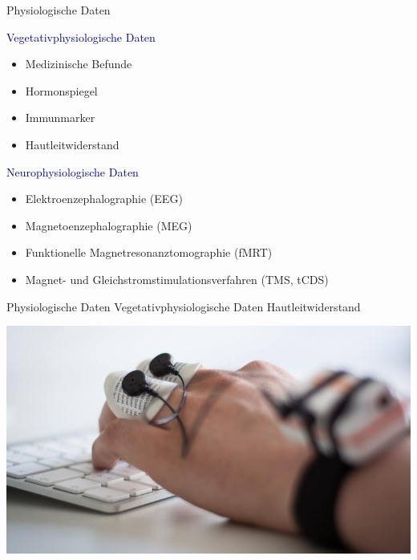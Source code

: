 \documentclass[
  8pt,
  ignorenonframetext,
]{beamer}
\providecommand{\tightlist}{%
  \setlength{\itemsep}{0pt}\setlength{\parskip}{0pt}}
\begin{document}
\begin{frame}{Physiologische Daten}
\protect\hypertarget{physiologische-daten}{}

\textcolor{darkblue}{Vegetativphysiologische Daten}

\begin{itemize}
\tightlist
\item
  Medizinische Befunde
\item
  Hormonspiegel
\item
  Immunmarker
\item
  Hautleitwiderstand
\end{itemize}

\textcolor{darkblue}{Neurophysiologische Daten}

\begin{itemize}
\tightlist
\item
  Elektroenzephalographie (EEG)
\item
  Magnetoenzephalographie (MEG)
\item
  Funktionelle Magnetresonanztomographie (fMRT)
\item
  Magnet- und Gleichstromstimulationsverfahren (TMS, tCDS)
\end{itemize}
\end{frame}

\begin{frame}{Physiologische Daten}
\protect\hypertarget{physiologische-daten-1}{}
Vegetativphysiologische Daten \textbar{} Hautleitwiderstand\\
\vspace{5mm}

\begin{center}\includegraphics[width=0.75\linewidth]{3_Abbildungen/pfm_3_hautleitwiderstand} \end{center}
\end{frame}
\end{document}
